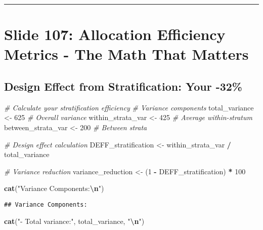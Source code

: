 \documentclass[
]{article}
\newenvironment{Shaded}{\begin{snugshade}}{\end{snugshade}}
\newcommand{\CommentTok}[1]{\textcolor[rgb]{0.56,0.35,0.01}{\textit{#1}}}
\newcommand{\DecValTok}[1]{\textcolor[rgb]{0.00,0.00,0.81}{#1}}
\newcommand{\FunctionTok}[1]{\textcolor[rgb]{0.13,0.29,0.53}{\textbf{#1}}}
\newcommand{\NormalTok}[1]{#1}
\newcommand{\OtherTok}[1]{\textcolor[rgb]{0.56,0.35,0.01}{#1}}
\newcommand{\SpecialCharTok}[1]{\textcolor[rgb]{0.81,0.36,0.00}{\textbf{#1}}}
\newcommand{\StringTok}[1]{\textcolor[rgb]{0.31,0.60,0.02}{#1}}
\begin{document}
\begin{center}\rule{0.5\linewidth}{0.5pt}\end{center}

\section{Slide 107: Allocation Efficiency Metrics - The Math That
Matters}\label{slide-107-allocation-efficiency-metrics---the-math-that-matters}

\subsection{Design Effect from Stratification: Your
-32\%}\label{design-effect-from-stratification-your--32}

\begin{Shaded}
\begin{Highlighting}[]
\CommentTok{\# Calculate your stratification efficiency}
\CommentTok{\# Variance components}
\NormalTok{total\_variance }\OtherTok{\textless{}{-}} \DecValTok{625}  \CommentTok{\# Overall variance}
\NormalTok{within\_strata\_var }\OtherTok{\textless{}{-}} \DecValTok{425}  \CommentTok{\# Average within{-}stratum}
\NormalTok{between\_strata\_var }\OtherTok{\textless{}{-}} \DecValTok{200}  \CommentTok{\# Between strata}

\CommentTok{\# Design effect calculation}
\NormalTok{DEFF\_stratification }\OtherTok{\textless{}{-}}\NormalTok{ within\_strata\_var }\SpecialCharTok{/}\NormalTok{ total\_variance}

\CommentTok{\# Variance reduction}
\NormalTok{variance\_reduction }\OtherTok{\textless{}{-}}\NormalTok{ (}\DecValTok{1} \SpecialCharTok{{-}}\NormalTok{ DEFF\_stratification) }\SpecialCharTok{*} \DecValTok{100}

\FunctionTok{cat}\NormalTok{(}\StringTok{"Variance Components:}\SpecialCharTok{\textbackslash{}n}\StringTok{"}\NormalTok{)}
\end{Highlighting}
\end{Shaded}

\begin{verbatim}
## Variance Components:
\end{verbatim}

\begin{Shaded}
\begin{Highlighting}[]
\FunctionTok{cat}\NormalTok{(}\StringTok{"{-} Total variance:"}\NormalTok{, total\_variance, }\StringTok{"}\SpecialCharTok{\textbackslash{}n}\StringTok{"}\NormalTok{)}
\end{Highlighting}
\end{Shaded}
\end{document}
